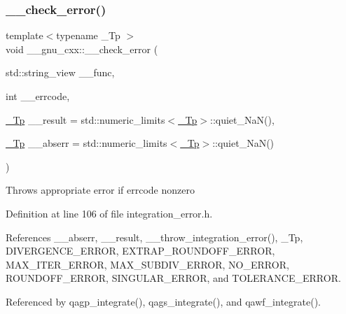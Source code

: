 \subsubsection{\texorpdfstring{\+\_\+\+\_\+check\+\_\+error()}{\_\_check\_error()}}
{\footnotesize\ttfamily template$<$typename \+\_\+\+Tp $>$ \\
void \+\_\+\+\_\+gnu\+\_\+cxx\+::\+\_\+\+\_\+check\+\_\+error (\begin{DoxyParamCaption}\item[{std\+::string\+\_\+view}]{\+\_\+\+\_\+func,  }\item[{int}]{\+\_\+\+\_\+errcode,  }\item[{\hyperlink{namespace____gnu__cxx_a3b19a9c800ca194374ef9172290f7d79}{\+\_\+\+Tp}}]{\+\_\+\+\_\+result = {\ttfamily std\+:\+:numeric\+\_\+limits$<$\hyperlink{namespace____gnu__cxx_a3b19a9c800ca194374ef9172290f7d79}{\+\_\+\+Tp}$>$\+:\+:quiet\+\_\+NaN()},  }\item[{\hyperlink{namespace____gnu__cxx_a3b19a9c800ca194374ef9172290f7d79}{\+\_\+\+Tp}}]{\+\_\+\+\_\+abserr = {\ttfamily std\+:\+:numeric\+\_\+limits$<$\hyperlink{namespace____gnu__cxx_a3b19a9c800ca194374ef9172290f7d79}{\+\_\+\+Tp}$>$\+:\+:quiet\+\_\+NaN()} }\end{DoxyParamCaption})}

Throws appropriate error if errcode nonzero 

Definition at line 106 of file integration\+\_\+error.\+h.



References \+\_\+\+\_\+abserr, \+\_\+\+\_\+result, \+\_\+\+\_\+throw\+\_\+integration\+\_\+error(), \+\_\+\+Tp, D\+I\+V\+E\+R\+G\+E\+N\+C\+E\+\_\+\+E\+R\+R\+OR, E\+X\+T\+R\+A\+P\+\_\+\+R\+O\+U\+N\+D\+O\+F\+F\+\_\+\+E\+R\+R\+OR, M\+A\+X\+\_\+\+I\+T\+E\+R\+\_\+\+E\+R\+R\+OR, M\+A\+X\+\_\+\+S\+U\+B\+D\+I\+V\+\_\+\+E\+R\+R\+OR, N\+O\+\_\+\+E\+R\+R\+OR, R\+O\+U\+N\+D\+O\+F\+F\+\_\+\+E\+R\+R\+OR, S\+I\+N\+G\+U\+L\+A\+R\+\_\+\+E\+R\+R\+OR, and T\+O\+L\+E\+R\+A\+N\+C\+E\+\_\+\+E\+R\+R\+OR.



Referenced by qagp\+\_\+integrate(), qags\+\_\+integrate(), and qawf\+\_\+integrate().


